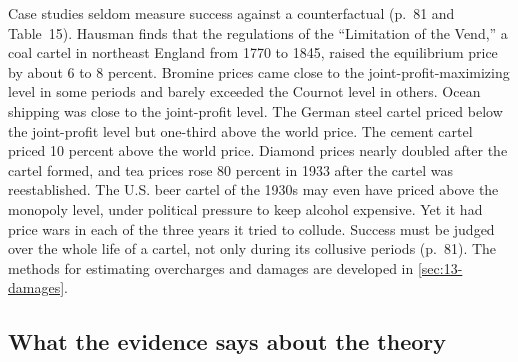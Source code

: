 Case studies seldom measure success against a counterfactual (p.~81 and Table~15). Hausman finds that the regulations
of the ``Limitation of the Vend,'' a coal cartel in northeast England from 1770 to 1845, raised the equilibrium price
by about 6 to 8 percent. Bromine prices came close to the joint-profit-maximizing level in some periods and barely
exceeded the Cournot level in others. Ocean shipping was close to the joint-profit level. The German steel cartel
priced below the joint-profit level but one-third above the world price. The cement cartel priced 10 percent above
the world price. Diamond prices nearly doubled after the cartel formed, and tea prices rose 80 percent
in 1933 after the cartel was reestablished. The U.S. beer cartel of the 1930s may even have priced above the monopoly
level, under political pressure to keep alcohol expensive. Yet it had price wars in each of the three years it tried
to collude. Success must be judged over the whole life of a cartel, not only during its collusive periods (p.~81). The
methods for estimating overcharges and damages are developed in \cref{sec:13-damages}.

\subsection{What the evidence says about the theory}\label{sec:12-ls-theory}

